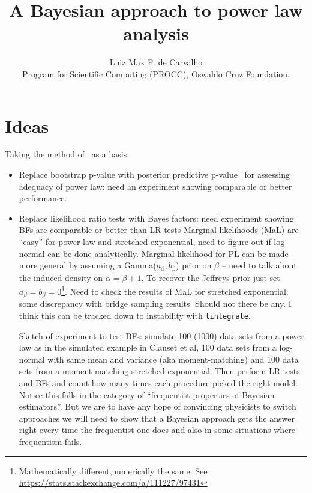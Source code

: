\documentclass[a4paper, notitlepage, 10pt]{article}
\title{\vspace{-9ex}\centering \bf A Bayesian approach to power law analysis}
\author{
Luiz Max F. de Carvalho\\
Program for Scientific Computing (PROCC), Oswaldo Cruz Foundation. \\
}
\begin{document}
\maketitle

% 

\section{Ideas}
Taking the method of~\cite{Clauset2009} as a basis:
\begin{itemize}
 \item Replace bootstrap p-value with posterior predictive p-value~\citep{Gabry2017} for assessing adequacy of power law: need an experiment showing comparable or better performance.
 \item Replace likelihood ratio tests with Bayes factors: need experiment showing BFs are comparable or better than LR tests
 \subitem Marginal likelihoods (MaL) are ``easy'' for power law and stretched exponential, need to figure out if log-normal can be done analytically.
 Marginal likelihood for PL can be made more general by assuming a Gamma($a_\beta, b_\beta$) prior on $\beta$  -- need to talk about the induced density on $\alpha = \beta + 1$.
 To recover the Jeffreys prior just set $a_\beta = b_\beta = 0$\footnote{Mathematically different,numerically the same. See \url{https://stats.stackexchange.com/a/111227/97431}}.
 Need to check the results of MaL for stretched exponential: some discrepancy with bridge sampling results.
 Should not there be any.
 I think this can be tracked down to instability with \verb|lintegrate|.
 
 \subitem Sketch of experiment to test BFs: simulate 100 (1000) data sets from a power law as in the simulated example in Clauset et al, 100 data sets from a log-normal with same mean and variance (aka moment-matching) and 100 data sets from a moment matching stretched exponential.
 Then perform LR tests and BFs and count how many times each procedure picked the right model.
 Notice this falls in the category of ``frequentist properties of Bayesian estimators''. 
 But we are to have any hope of convincing physicists to switch approaches we will need to show that a Bayesian approach gets the answer right every time the frequentist one does and also in some situations where frequentism fails. 
\end{itemize}
\end{document}
